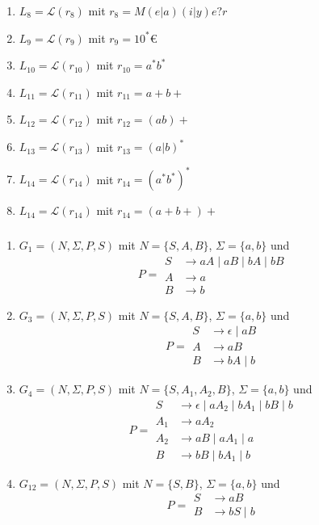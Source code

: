 \documentclass[a4paper, fleqn]{article}
\begin{document}
\subsubsection{}
\begin{enumerate}[label=\alph*)]
    \item $L_8=\mathcal{L}(r_8)$ mit $r_8=M(e|a)(i|y)e?r$
    \item $L_9=\mathcal{L}(r_9)$ mit $r_9=10^*$€
    \item $L_{10}=\mathcal{L}(r_{10})$ mit $r_{10}=a^*b^*$
    \item $L_{11}=\mathcal{L}(r_{11})$ mit $r_{11}=a+b+$
    \item $L_{12}=\mathcal{L}(r_{12})$ mit $r_{12}=(ab)+$
    \item $L_{13}=\mathcal{L}(r_{13})$ mit $r_{13}=(a|b)^*$
    \item $L_{14}=\mathcal{L}(r_{14})$ mit $r_{14}=(a^*b^*)^*$
    \item $L_{14}=\mathcal{L}(r_{14})$ mit $r_{14}=(a+b+)+$
\end{enumerate}
\subsubsection{}
\begin{enumerate}[label=\alph*)]
    \item $G_1=(N,\Sigma,P,S)$ mit $N=\{S, A, B\}$, $\Sigma=\{a,b\}$ und
    \[P=
    \begin{split}
        S&\rightarrow aA\mid aB\mid bA\mid bB\\
        A&\rightarrow a\\
        B&\rightarrow b
    \end{split}
    \]
    \item $G_3=(N,\Sigma,P,S)$ mit $N=\{S, A, B\}$, $\Sigma=\{a,b\}$ und
    \[P=
    \begin{split}
        S&\rightarrow \epsilon\mid aB\\
        A&\rightarrow aB\\
        B&\rightarrow bA\mid b
    \end{split}
    \]
    \item $G_4=(N,\Sigma,P,S)$ mit $N=\{S, A_1, A_2, B\}$, $\Sigma=\{a,b\}$ und
    \[P=
    \begin{split}
        S&\rightarrow \epsilon\mid aA_2\mid bA_1\mid bB\mid b\\
        A_1&\rightarrow aA_2\\
        A_2&\rightarrow aB\mid aA_1\mid a\\
        B&\rightarrow bB\mid bA_1\mid b
    \end{split}
    \]
    \item $G_{12}=(N,\Sigma,P,S)$ mit $N=\{S, B\}$, $\Sigma=\{a,b\}$ und
    \[P=
    \begin{split}
        S&\rightarrow aB\\
        B&\rightarrow bS\mid b
    \end{split}
    \]
\end{enumerate}
\end{document}
